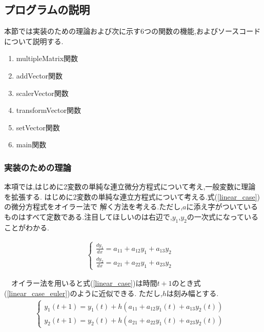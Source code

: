 \documentclass[a4j]{jarticle}
\begin{document}
      \subsection{プログラムの説明}
      本節では実装のための理論および次に示す6つの関数の機能,およびソースコードについて説明する.
      \begin{enumerate}
        \item multipleMatrix関数
        \item addVector関数
        \item scalerVector関数
        \item transformVector関数
        \item setVector関数
        \item main関数
      \end{enumerate}

      \subsubsection{実装のための理論}
      本項では,はじめに2変数の単純な連立微分方程式について考え,一般変数に理論を拡張する.
      はじめに2変数の単純な連立方程式について考える.式(\ref{linear_case})の微分方程式をオイラー法で
      解く方法を考える.ただし,$a$に添え字がついているものはすべて定数である.注目してほしいのは右辺で,$y_1$,$y_2$の一次式になっていることがわかる.

      \begin{eqnarray}
      \begin{cases}
        \frac{dy_1}{dx} = a_{11} + a_{12} y_1 + a_{13} y_2 & \\
        \frac{dy_2}{dx} = a_{21} + a_{22} y_1 + a_{23} y_2 &
      \end{cases}
      \label{linear_case}
    \end{eqnarray}      

    　オイラー法を用いると式(\ref{linear_case})は時間$t+1$のとき式(\ref{linear_case_euler})のように近似できる.
    ただし,$h$は刻み幅とする.
    \begin{eqnarray}
      \begin{cases}
        y_1(t+1) = y_1(t) + h(a_{11} + a_{12} y_1(t) + a_{13} y_2(t)) & \\
        y_2(t+1) = y_2(t) + h(a_{21} + a_{22} y_1(t) + a_{23} y_2(t)) &
      \end{cases}
      \label{linear_case_euler}
    \end{eqnarray}      
    
\end{document}
